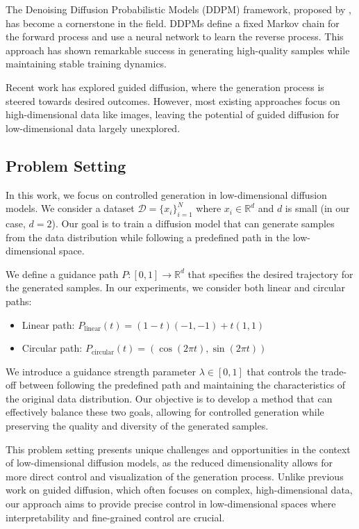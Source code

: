\documentclass{article} %
\begin{document}
The Denoising Diffusion Probabilistic Models (DDPM) framework, proposed by \citet{ddpm}, has become a cornerstone in the field. DDPMs define a fixed Markov chain for the forward process and use a neural network to learn the reverse process. This approach has shown remarkable success in generating high-quality samples while maintaining stable training dynamics.

Recent work has explored guided diffusion, where the generation process is steered towards desired outcomes. However, most existing approaches focus on high-dimensional data like images, leaving the potential of guided diffusion for low-dimensional data largely unexplored.

\subsection{Problem Setting}

In this work, we focus on controlled generation in low-dimensional diffusion models. We consider a dataset $\mathcal{D} = \{x_i\}_{i=1}^N$ where $x_i \in \mathbb{R}^d$ and $d$ is small (in our case, $d=2${)}. Our goal is to train a diffusion model that can generate samples from the data distribution while following a predefined path in the low-dimensional space.

We define a guidance path $P: [0, 1] \rightarrow \mathbb{R}^d$ that specifies the desired trajectory for the generated samples. In our experiments, we consider both linear and circular paths:

\begin{itemize}
    \item Linear path: $P_{\text{linear}}(t) = (1-t)(-1, -1) + t(1, 1)$
    \item Circular path: $P_{\text{circular}}(t) = (\cos(2\pi t), \sin(2\pi t))$
\end{itemize}

We introduce a guidance strength parameter $\lambda \in [0, 1]$ that controls the trade-off between following the predefined path and maintaining the characteristics of the original data distribution. Our objective is to develop a method that can effectively balance these two goals, allowing for controlled generation while preserving the quality and diversity of the generated samples.

This problem setting presents unique challenges and opportunities in the context of low-dimensional diffusion models, as the reduced dimensionality allows for more direct control and visualization of the generation process. Unlike previous work on guided diffusion, which often focuses on complex, high-dimensional data, our approach aims to provide precise control in low-dimensional spaces where interpretability and fine-grained control are crucial.
\end{document}
